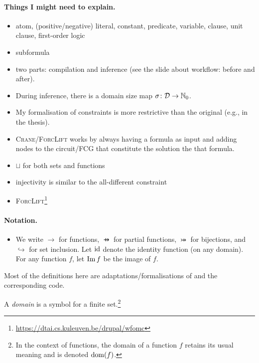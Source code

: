 \paragraph{Things I might need to explain.}
\begin{itemize}
  \item atom, (positive/negative) literal, constant, predicate, variable,
        clause, unit clause, first-order logic
  \item subformula
  \item two parts: compilation and inference (see the slide about workflow:
        before and after).
  \item During inference, there is a domain size map
        $\operatorname{\sigma}\colon \mathcal{D} \to \mathbb{N}_0$.
  \item My formalisation of constraints is more restrictive than the original
        (e.g., in the thesis).
  \item \textsc{Crane/ForcLift} works by always having a formula as input and
        adding nodes to the circuit/FCG that constitute the solution the that
        formula.
  \item $\sqcup$ for both sets and functions
  \item injectivity is similar to the all-different constraint
  \item \textsc{ForcLift}\footnote{\url{https://dtai.cs.kuleuven.be/drupal/wfomc}}
\end{itemize}

\paragraph{Notation.}
\begin{itemize}
  \item We write $\to$ for functions, $\pfun$ for partial functions,
        $\twoheadrightarrowtail$ for bijections, and $\hookrightarrow$ for set
        inclusion. Let $\operatorname{id}$ denote the identity function (on any domain). For
        any function $f$, let $\operatorname{Im} f$ be the image of $f$.
\end{itemize}

Most of the definitions here are adaptations/formalisations of
\citep{DBLP:conf/ijcai/BroeckTMDR11} and the corresponding code.

\begin{definition}
  A \emph{domain} is a symbol for a finite set.\footnote{In the context of
    functions, the domain of a function $f$ retains its usual meaning and is
    denoted $\operatorname{dom}(f)$.}
\end{definition}

